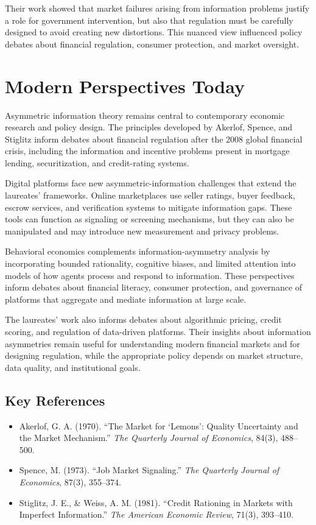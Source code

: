 Their work showed that market failures arising from information problems
justify a role for government intervention, but also that regulation must
be carefully designed to avoid creating new distortions. This nuanced view
influenced policy debates about financial regulation, consumer protection,
and market oversight.

\section{Modern Perspectives Today}
Asymmetric information theory remains central to contemporary economic research
and policy design. The principles developed by Akerlof, Spence, and Stiglitz
inform debates about financial regulation after the 2008 global financial crisis,
including the information and incentive problems present in mortgage lending,
securitization, and credit-rating systems.

Digital platforms face new asymmetric-information challenges that extend the
laureates' frameworks. Online marketplaces use seller ratings, buyer feedback,
escrow services, and verification systems to mitigate information gaps. These
tools can function as signaling or screening mechanisms, but they can also be
manipulated and may introduce new measurement and privacy problems.

Behavioral economics complements information-asymmetry analysis by incorporating
bounded rationality, cognitive biases, and limited attention into models of how
agents process and respond to information. These perspectives inform debates
about financial literacy, consumer protection, and governance of platforms that
aggregate and mediate information at large scale.

The laureates' work also informs debates about algorithmic pricing, credit
scoring, and regulation of data-driven platforms. Their insights about information
asymmetries remain useful for understanding modern financial markets and for
designing regulation, while the appropriate policy depends on market structure,
data quality, and institutional goals.

\subsection*{Key References}
\begin{itemize}
    \item Akerlof, G. A. (1970). ``The Market for `Lemons': Quality Uncertainty and the Market Mechanism.'' \textit{The Quarterly Journal of Economics}, 84(3), 488--500.
    \item Spence, M. (1973). ``Job Market Signaling.'' \textit{The Quarterly Journal of Economics}, 87(3), 355--374.
    \item Stiglitz, J. E., \& Weiss, A. M. (1981). ``Credit Rationing in Markets with Imperfect Information.'' \textit{The American Economic Review}, 71(3), 393--410.
\end{itemize}

